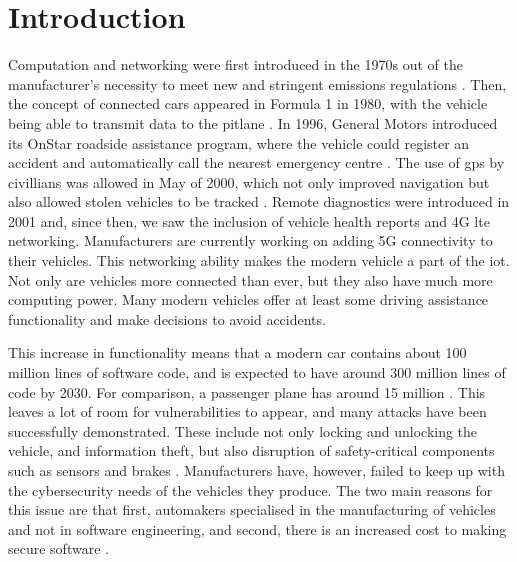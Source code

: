 \chapter{Introduction}
\label{c:intro}

Computation and networking were first introduced in the 1970s out of the manufacturer's necessity to meet new and stringent emissions regulations \citep{pelkmans2003trends}. Then, the concept of connected cars appeared in Formula 1 in 1980, with the vehicle being able to transmit data to the pitlane \citep{bmwConnectedCar}. In 1996, General Motors introduced its OnStar roadside assistance program, where the vehicle could register an accident and automatically call the nearest emergency centre \citep{sspiConnectedCar}. The use of \gls{gps} by civillians was allowed in May of 2000, which not only improved navigation but also allowed stolen vehicles to be tracked \citep{bmwConnectedCar}. Remote diagnostics were introduced in 2001 and, since then, we saw the inclusion of vehicle health reports and 4G \gls{lte} networking. Manufacturers are currently working on adding 5G connectivity to their vehicles. This networking ability makes the modern vehicle a part of the \gls{iot}. Not only are vehicles more connected than ever, but they also have much more computing power. Many modern vehicles offer at least some driving assistance functionality and make decisions to avoid accidents.\par

This increase in functionality means that a modern car contains about 100 million lines of software code, and is expected to have around 300 million lines of code by 2030. For comparison, a passenger plane has around 15 million \citep{yahooCarSecurity}. This leaves a lot of room for vulnerabilities to appear, and many attacks have been successfully demonstrated. These include not only locking and unlocking the vehicle, and information theft, but also disruption of safety-critical components such as sensors and brakes \citep{Kim2021}. Manufacturers have, however, failed to keep up with the cybersecurity needs of the vehicles they produce. The two main reasons for this issue are that first, automakers specialised in the manufacturing of vehicles and not in software engineering, and second, there is an increased cost to making secure software \citep{forbesSecurityCost}.\par

